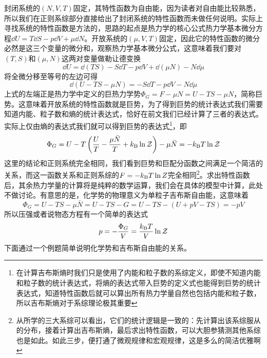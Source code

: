 \documentclass[../../main.tex]{subfiles}
\begin{document}
封闭系统的\((N,V,T)\)固定，其特性函数为自由能，因为读者对自由能比较熟悉，所以我们在正则系综部分直接给出了封闭系统的特性函数而未做任何说明。实际上寻找系统的特性函数是方法的，思路的起点是热力学的核心公式热力学基本微分方程\(\dd U=T\dd S-p\dd V+\mu \dd N\)。开放系统的\((\mu,V,T)\)固定，因此它的特性函数的微分必然是这三个变量的微分和，观察热力学基本微分公式，这意味着我们要对\((T,S)\)和\((\mu,N)\)这两对变量做勒让德变换
\begin{equation}
    \dd U=\dd(TS)-S\dd T-p\dd V+\dd(\mu N)-N\dd\mu
\end{equation}
将全微分移至等号的左边可得
\begin{equation}
    \dd(U-TS-\mu N)=-S\dd T-p\dd V-N\dd\mu
\end{equation}
上式的左端正是热力学中定义的巨热力学势\(\Phi_{G}=F-\mu N=U-TS-\mu N\)，简称巨势。这意味着开放系统的特性函数就是巨势，为了得到巨势的统计表达式我们需要知道内能、粒子数和熵的统计表达式，恰好在前文我们已经计算了三者的表达式。实际上仅由熵的表达式我们就可以得到巨势的表达式\footnote{在计算吉布斯熵时我们只是使用了内能和粒子数的系综定义，即使不知道内能和粒子数的统计表达式，将熵的表达式带入巨势的定义式也能得到巨势的统计表达式，知道特性函数后就可以算出所有热力学量自然也包括内能和粒子数，所以吉布斯熵对于系综理论极其重要}，即
\begin{equation}
    \Phi_{G}=U-T\left(\frac{U}{T}-\frac{\mu\bar{N}}{T}+k_{\mathrm{B}}\ln\mathcal{Z}\right)-\mu\bar{N}=-k_{\mathrm{B}} T\ln\mathcal{Z}
\end{equation}
这里的结论和正则系统完全相同，我们看到巨势和巨配分函数之间满足一个简洁的关系，而这一函数关系和正则系综的\(F=-k_{\mathrm{B}} T\ln Z\)完全相同\footnote{从所学的三大系综可以看出，它们的统计逻辑是一致的：先计算出该系综服从的分布，接着计算出吉布斯熵，最后求出特性函数，可以大胆参猜测其他系综也是如此。如此三步，便打通了微观规律和宏观规律，这是多么的简洁优雅啊}。求出特性函数后，其余热力学量的计算将是纯粹的数学运算，我们会在具体的模型中计算，此处不做讨论。有意思的是，化学势的物理意义为单粒子吉布斯自由能，这意味着
\begin{equation}
    \Phi_{G}=U-TS-\mu \bar{N}=U-TS-G=U-TS-(U+pV-TS)=-pV
\end{equation}
所以压强或者说物态方程有一个简单的表达式
\begin{equation}
    p=-\frac{\Phi_{G}}{V}=\frac{k_{\mathrm{B}} T}{V}\ln\mathcal{Z}
\end{equation}
下面通过一个例题简单说明化学势和吉布斯自由能的关系。
\end{document}
